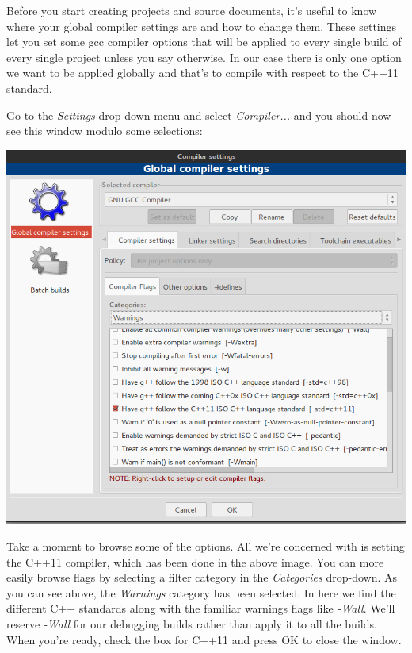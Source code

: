 \documentclass[10pt]{article}
\begin{document}
Before you start creating projects and source documents, it's useful to know where your global compiler settings are and how to change them. These settings let you set some gcc compiler options that will be applied to every single build of every single project unless you say otherwise. In our case there is only one option we want to be applied globally and that's to compile with respect to the C++11 standard.


Go to the \textit{Settings} drop-down menu and select \textit{Compiler...} and you should now see this window modulo some selections:

\vspace{.1in}
\begin{center}
\includegraphics[scale=.5]{CB_GlobalCompiler.png}
\end{center}
\vspace{.1in}

Take a moment to browse some of the options. 	All we're concerned with is setting the C++11 compiler, which has been done in the above image. You can more easily browse flags by selecting a filter category in the \textit{Categories} drop-down. As you can see above, the \textit{Warnings} category has been selected. In here we find the different C++ standards along with the familiar warnings flags like \textit{-Wall}.  We'll reserve \textit{-Wall} for our debugging builds rather than apply it to all the builds. When you're ready, check the box for C++11 and press OK to close the window.
\end{document}
